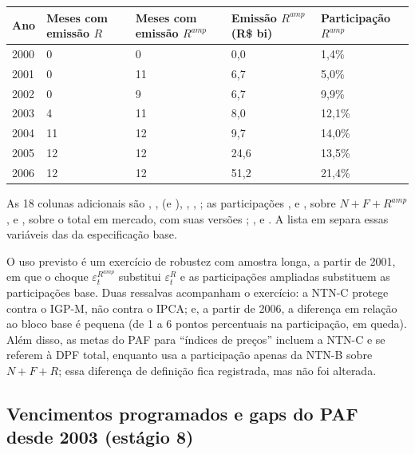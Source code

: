 \documentclass[12pt,a4paper]{article}
\begin{document}
\begin{longtable}{p{}p{}p{}p{}p{}}
\toprule
\textbf{Ano} & \textbf{Meses com emissão \(R\)} & \textbf{Meses com emissão \(R^{amp}\)} &
\textbf{Emissão \(R^{amp}\) (R\$ bi)} & \textbf{Participação \(R^{amp}\)} \\
\midrule
\endhead
2000 & 0 & 0 & 0,0 & 1,4\% \\
2001 & 0 & 11 & 6,7 & 5,0\% \\
2002 & 0 & 9 & 6,7 & 9,9\% \\
2003 & 4 & 11 & 8,0 & 12,1\% \\
2004 & 11 & 12 & 9,7 & 14,0\% \\
2005 & 12 & 12 & 24,6 & 13,5\% \\
2006 & 12 & 12 & 51,2 & 21,4\% \\
\bottomrule
\end{longtable}

As 18 colunas adicionais são , ,
 (e ), ,
, ; as participações
,  e , sobre
\(N+F+R^{amp}\), e , sobre o total em mercado, com suas
versões ; , 
e . A lista
 em 
separa essas variáveis das da especificação base.

O uso previsto é um exercício de robustez com amostra longa, a partir de 2001, em
que o choque \(\varepsilon_t^{R^{amp}}\) substitui \(\varepsilon_t^R\) e as participações
ampliadas substituem as participações base. Duas ressalvas acompanham o exercício: a
NTN-C protege contra o IGP-M, não contra o IPCA; e, a partir de 2006, a diferença em
relação ao bloco base é pequena (de 1 a 6 pontos percentuais na participação, em
queda). Além disso, as metas do PAF para ``índices de preços'' incluem a NTN-C e se
referem à DPF total, enquanto  usa a participação apenas da
NTN-B sobre \(N+F+R\); essa diferença de definição fica registrada, mas não foi
alterada.

\subsection{Vencimentos programados e gaps do PAF desde 2003 (estágio 8)}\label{sec:venc}
\end{document}
